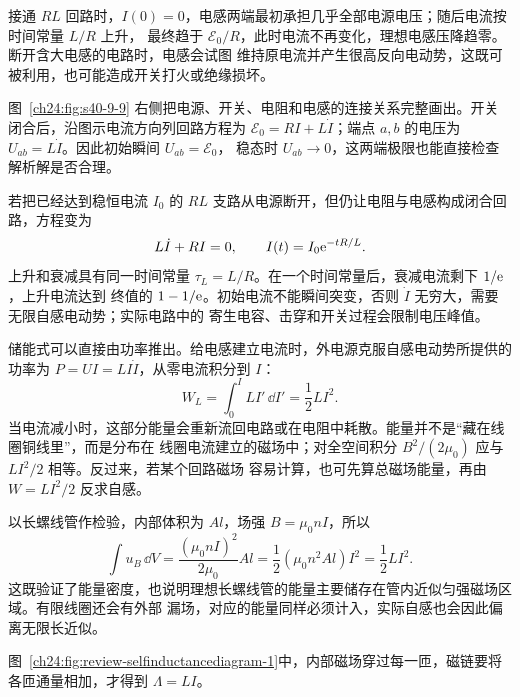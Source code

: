 {接通 $RL$ 回路时，$I(0)=0$，电感两端最初承担几乎全部电源电压；随后电流按时间常量 $L/R$ 上升，
最终趋于 $\mathcal E_0/R$，此时电流不再变化，理想电感压降趋零。断开含大电感的电路时，电感会试图
维持原电流并产生很高反向电动势，这既可被利用，也可能造成开关打火或绝缘损坏。

图~\ref{ch24:fig:s40-9-9} 右侧把电源、开关、电阻和电感的连接关系完整画出。开关闭合后，沿图示电流方向列回路方程为
$\mathcal E_0=RI+L\dot I$；端点 $a,b$ 的电压为 $U_{ab}=L\dot I$。因此初始瞬间 $U_{ab}=\mathcal E_0$，
稳态时 $U_{ab}\to0$，这两端极限也能直接检查解析解是否合理。

\rlInductorContext

若把已经达到稳恒电流 $I_0$ 的 $RL$ 支路从电源断开，但仍让电阻与电感构成闭合回路，方程变为
\begin{equation}
  L\dot I+RI=0,\qquad I(t)=I_0\mathrm e^{-tR/L}.
\end{equation}
上升和衰减具有同一时间常量 $\tau_L=L/R$。在一个时间常量后，衰减电流剩下 $1/\mathrm e$，上升电流达到
终值的 $1-1/\mathrm e$。初始电流不能瞬间突变，否则 $\dot I$ 无穷大，需要无限自感电动势；实际电路中的
寄生电容、击穿和开关过程会限制电压峰值。

储能式可以直接由功率推出。给电感建立电流时，外电源克服自感电动势所提供的功率为
$P=UI=LI\dot I$，从零电流积分到 $I$：
\begin{equation}
  W_L=\int_0^I LI'\,\dd I'=\frac12LI^2.
\end{equation}
当电流减小时，这部分能量会重新流回电路或在电阻中耗散。能量并不是“藏在线圈铜线里”，而是分布在
线圈电流建立的磁场中；对全空间积分 $B^2/(2\mu_0)$ 应与 $LI^2/2$ 相等。反过来，若某个回路磁场
容易计算，也可先算总磁场能量，再由 $W=LI^2/2$ 反求自感。

以长螺线管作检验，内部体积为 $Al$，场强 $B=\mu_0nI$，所以
\begin{equation}
  \int u_B\,\dd V
  =\frac{(\mu_0nI)^2}{2\mu_0}Al
  =\frac12(\mu_0n^2Al)I^2
  =\frac12LI^2.
\end{equation}
这既验证了能量密度，也说明理想长螺线管的能量主要储存在管内近似匀强磁场区域。有限线圈还会有外部
漏场，对应的能量同样必须计入，实际自感也会因此偏离无限长近似。

图~\ref{ch24:fig:review-selfinductancediagram-1}中，内部磁场穿过每一匝，磁链要将各匝通量相加，才得到 $\Lambda=LI$。
\par\noindent\begin{minipage}{\linewidth}
\selfInductanceDiagram
{}
\end{minipage}\par\medskip


}
